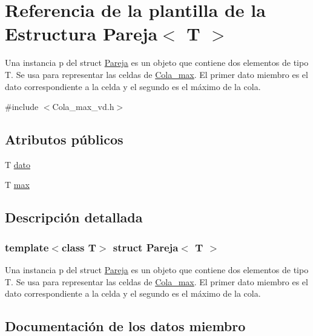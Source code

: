 \hypertarget{structPareja}{}\section{Referencia de la plantilla de la Estructura Pareja$<$ T $>$}
\label{structPareja}


Una instancia p del struct \hyperlink{structPareja}{Pareja} es un objeto que contiene dos elementos de tipo T. Se usa para representar las celdas de \hyperlink{classCola__max}{Cola\+\_\+max}. El primer dato miembro es el dato correspondiente a la celda y el segundo es el máximo de la cola.  




{\ttfamily \#include $<$Cola\+\_\+max\+\_\+vd.\+h$>$}

\subsection*{Atributos públicos}
\begin{DoxyCompactItemize}
\item 
T \hyperlink{structPareja_a92ba8ec3cc72ad6a062e0bc29dc7b01a}{dato}
\item 
T \hyperlink{structPareja_a96221751f41f7524fba3e22e963e3e4f}{max}
\end{DoxyCompactItemize}


\subsection{Descripción detallada}
\subsubsection*{template$<$class T$>$\newline
struct Pareja$<$ T $>$}

Una instancia p del struct \hyperlink{structPareja}{Pareja} es un objeto que contiene dos elementos de tipo T. Se usa para representar las celdas de \hyperlink{classCola__max}{Cola\+\_\+max}. El primer dato miembro es el dato correspondiente a la celda y el segundo es el máximo de la cola. 

\subsection{Documentación de los datos miembro}
\mbox{\label{structPareja_a92ba8ec3cc72ad6a062e0bc29dc7b01a}} 
